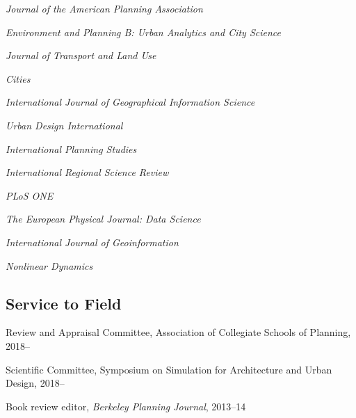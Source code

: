 \documentclass[12pt,letterpaper]{report}
\newcommand{\listitemspace}{0.15em}
\renewenvironment{itemize}
{\begin{list}{}{\setlength{\leftmargin}{0em}
			\setlength{\parskip}{0em}
			\setlength{\itemsep}{\listitemspace}
			\setlength{\parsep}{\listitemspace}}}
	{\end{list}}
\begin{document}
	\begin{itemize}
		
		\item \textit{Journal of the American Planning Association}
		
		\item \textit{Environment and Planning B: Urban Analytics and City Science}
		
		\item \textit{Journal of Transport and Land Use}
		
		\item \textit{Cities}
		
		\item \textit{International Journal of Geographical Information Science}
		
		\item \textit{Urban Design International}
		
		\item \textit{International Planning Studies}
		
		\item \textit{International Regional Science Review}
		
		\item \textit{PLoS ONE}
		
		\item \textit{The European Physical Journal: Data Science}
		
		\item \textit{International Journal of Geoinformation}
		
		\item \textit{Nonlinear Dynamics}
		
	\end{itemize}
	
	\subsection*{Service to Field}
	
	\begin{itemize}
		
		\item Review and Appraisal Committee, Association of Collegiate Schools of Planning, 2018--
		
		\item Scientific Committee, Symposium on Simulation for Architecture and Urban Design, 2018--
		
		\item Book review editor, \textit{Berkeley Planning Journal}, 2013--14
		
	\end{itemize}
	
\end{document}
